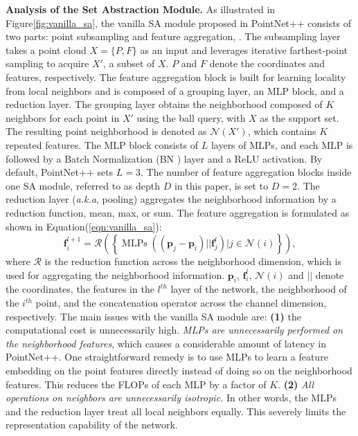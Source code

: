 \documentclass{article}
\newcommand{\figLabel}{Figure\xspace}
\newcommand{\eqnLabel}{Equation\xspace}
\newcommand{\eqnref}[1]{(\ref{#1})}
\newcommand{\mysection}[1]{\vspace{3pt}\noindent\textbf{#1.}}
\begin{document}
\mysection{Analysis of the Set Abstraction Module}
As illustrated in \figLabel \ref{fig:vanilla_sa}, the vanilla SA module proposed in PointNet++ consists of two parts: point subsampling and feature aggregation, .  
The subsampling layer takes a point cloud $X = \{P, F\}$ as an input and leverages iterative farthest-point sampling to acquire $X'$, a subset of $X$. $P$ and $F$ denote the coordinates and features, respectively. 
The feature aggregation block is built for learning locality from local neighbors and is composed of a grouping layer, an MLP block, and a reduction layer. The grouping layer obtains the neighborhood composed of $K$ neighbors for each point in $X'$ using the ball query, with $X$ as the support set. The resulting point neighborhood is denoted as $\mathcal{N}(X')$, which contains $K$ repeated features. 
The MLP block consists of $L$ layers of MLPs, and each MLP is followed by a Batch Normalization (BN \cite{DBLP:conf/icml/IoffeS15}) layer and a ReLU activation. By default, PointNet++ sets $L= 3$. The number of feature aggregation blocks inside one SA module, referred to as depth $D$ in this paper, is set to $D=2$. The reduction layer (\textit{a.k.a}, pooling) aggregates the neighborhood information by a reduction function, \eg mean, max, or sum. The feature aggregation is formulated as shown in \eqnLabel \eqnref{eqn:vanilla_sa}:
\begin{equation}\label{eqn:vanilla_sa}
\mathbf{f}_i^{l+1} =\mathcal{R}\left(\left\{\operatorname{MLPs}((\mathbf{p}_j - \mathbf{p}_i) || \mathbf{f}_j^l)|j\in \mathcal{N}(i)\right\}\right),
\end{equation}
where $\mathcal{R}$ is the reduction function across the neighborhood dimension, which is used for aggregating the neighborhood information. $\mathbf{p}_i$, $\mathbf{f}_i^l$,  $\mathcal{N}(i)$ and $||$ denote the coordinates, the features in the $l^{th}$ layer of the network, the neighborhood of the $i^{th}$ point, and the concatenation operator across the channel dimension, respectively. 
The main issues with the vanilla SA module are: \textbf{(1)} the computational cost is unnecessarily high. \textit{MLPs are unnecessarily performed on the neighborhood features}, which causes a considerable amount of latency in PointNet++. One straightforward remedy is to use MLPs to learn a feature embedding on the point features directly instead of doing so on the neighborhood features. This reduces the FLOPs of each MLP by a factor of $K$. \textbf{(2)} \textit{All operations on neighbors are unnecessarily isotropic.} In other words, the MLPs and the reduction layer treat all local neighbors equally. This severely limits the representation capability of the network. 
\end{document}
